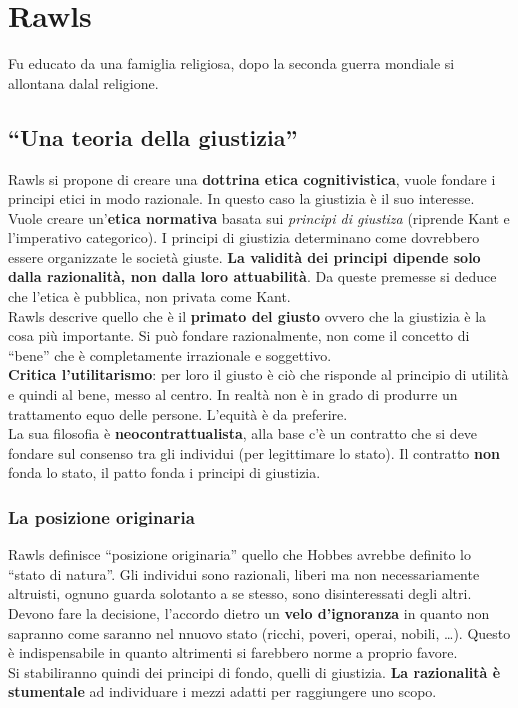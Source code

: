 
\section{Rawls}
Fu educato da una famiglia religiosa, dopo la seconda guerra mondiale si allontana dalal religione.

\subsection{``Una teoria della giustizia''}
Rawls si propone di creare una \textbf{dottrina etica cognitivistica}, vuole fondare i principi etici
in modo razionale. In questo caso la giustizia è il suo interesse. Vuole creare un'\textbf{etica
normativa} basata sui \textit{principi di giustiza} (riprende Kant e l'imperativo categorico). I
principi di giustizia determinano come dovrebbero essere organizzate le società giuste. \textbf{La
validità dei principi dipende solo dalla razionalità, non dalla loro attuabilità}. Da queste
premesse si deduce che l'etica è pubblica, non privata come Kant.\\
Rawls descrive quello che è il \textbf{primato del giusto} ovvero che la giustizia è la cosa più
importante. Si può fondare razionalmente, non come il concetto di ``bene'' che è completamente
irrazionale e soggettivo.\\ [\baselineskip]
\textbf{Critica l'utilitarismo}: per loro il giusto è ciò che risponde al principio di utilità e
quindi al bene, messo al centro. In realtà non è in grado di produrre un trattamento equo delle
persone. L'equità è da preferire.\\ [\baselineskip]
La sua filosofia è \textbf{neocontrattualista}, alla base c'è un contratto che si deve fondare sul
consenso tra gli individui (per legittimare lo stato). Il contratto \textbf{non} fonda lo stato,
il patto fonda i principi di giustizia.

\subsubsection{La posizione originaria}
Rawls definisce ``posizione originaria'' quello che Hobbes avrebbe definito lo ``stato di natura''.
Gli individui sono razionali, liberi ma non necessariamente altruisti, ognuno guarda solotanto a se
stesso, sono disinteressati degli altri. Devono fare la decisione, l'accordo dietro un \textbf{velo
d'ignoranza} in quanto non sapranno come saranno nel nnuovo stato (ricchi, poveri, operai, nobili,
\ldots). Questo è indispensabile in quanto altrimenti si farebbero norme a proprio favore.\\
Si stabiliranno quindi dei principi di fondo, quelli di giustizia. \textbf{La razionalità è 
stumentale} ad individuare i mezzi adatti per raggiungere uno scopo.

